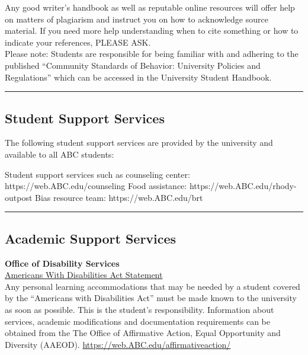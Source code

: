 Any good writer’s handbook as well as reputable online resources will offer help on matters of plagiarism and instruct you on how to acknowledge source material. If you need more help understanding when to cite something or how to indicate your references, PLEASE ASK.\\

Please note:  Students are responsible for being familiar with and adhering to the published ``Community Standards of Behavior: University Policies and Regulations'' which can be accessed in the University Student Handbook.\\

 \vspace{2ex}\hrule\vspace{2ex}

\subsection*{Student Support Services}
The following student support services are provided by the university and available to all ABC students: 
\begin{outline}
	\1	Student support services such as counseling center: https://web.ABC.edu/counseling 
	\1	Food assistance: https://web.ABC.edu/rhody-outpost 
	\1	Bias resource team: https://web.ABC.edu/brt 
\end{outline}

\vspace{2ex}\hrule\vspace{2ex}





\subsection*{Academic Support Services}

\textbf{Office of Disability Services}\\
\underline{Americans With Disabilities Act Statement}\\

Any personal learning accommodations that may be needed by a student covered by the ``Americans with Disabilities Act'' must be made known to the university as soon as possible.  This is the student's responsibility. Information about services, academic modifications and documentation requirements can be obtained from the The Office of Affirmative Action, Equal Opportunity and Diversity (AAEOD). \url{https://web.ABC.edu/affirmativeaction/}\\


